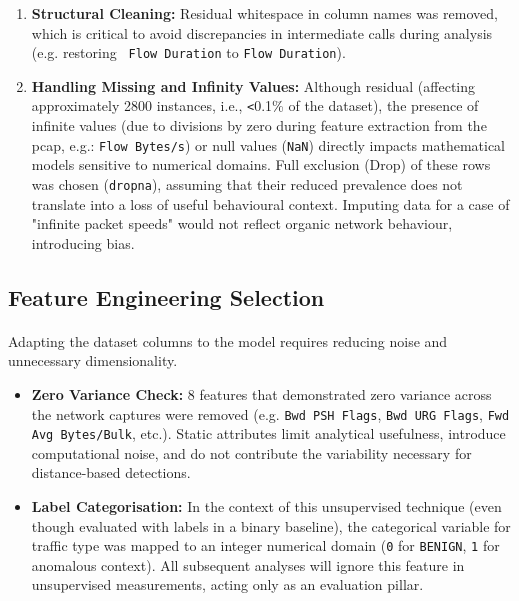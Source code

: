 \documentclass[11pt]{article}
\begin{document}
\begin{enumerate}

    \item \textbf{Structural Cleaning:} Residual whitespace in column names was removed, which is critical to avoid discrepancies in intermediate calls during analysis (e.g. restoring \texttt{ Flow Duration} to \texttt{Flow Duration}).
    \item \textbf{Handling Missing and Infinity Values:} Although residual (affecting approximately 2800 instances, i.e., \verb|<|0.1\% of the dataset), the presence of infinite values (due to divisions by zero during feature extraction from the pcap, e.g.: \texttt{Flow Bytes/s}) or null values (\texttt{NaN}) directly impacts mathematical models sensitive to numerical domains. Full exclusion (Drop) of these rows was chosen (\texttt{dropna}), assuming that their reduced prevalence does not translate into a loss of useful behavioural context. Imputing data for a case of "infinite packet speeds" would not reflect organic network behaviour, introducing bias.
\end{enumerate}

\subsection{Feature Engineering Selection}

\paragraph{}Adapting the dataset columns to the model requires reducing noise and unnecessary dimensionality.

\begin{itemize}
    \item \textbf{Zero Variance Check:} 8 features that demonstrated zero variance across the network captures were removed (e.g. \texttt{Bwd PSH Flags}, \texttt{Bwd URG Flags}, \texttt{Fwd Avg Bytes/Bulk}, etc.). Static attributes limit analytical usefulness, introduce computational noise, and do not contribute the variability necessary for distance-based detections.
    \item \textbf{Label Categorisation:} In the context of this unsupervised technique (even though evaluated with labels in a binary baseline), the categorical variable for traffic type was mapped to an integer numerical domain (\texttt{0} for \texttt{BENIGN}, \texttt{1} for anomalous context). All subsequent analyses will ignore this feature in unsupervised measurements, acting only as an evaluation pillar.
\end{itemize}
\end{document}

